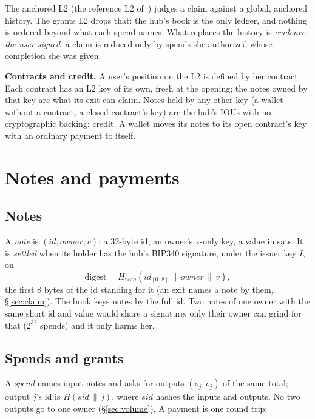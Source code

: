 \documentclass[11pt]{article}
\begin{document}
The anchored L2 (the reference L2 of~\cite{lichen}) judges a claim
against a global, anchored history. The grants L2 drops that: the hub's
book is the only ledger, and nothing is ordered beyond what each spend
names. What replaces the history is \emph{evidence the user signed}: a
claim is reduced only by spends she authorized whose completion she was
given.

\textbf{Contracts and credit.} A user's position on the L2 is defined by
her contract. Each contract has an L2 key of its own, fresh at the
opening; the notes owned by that key are what its exit can claim. Notes
held by any other key (a wallet without a contract, a closed contract's
key) are the hub's IOUs with no cryptographic backing: credit. A wallet
moves its notes to its open contract's key with an ordinary payment to
itself.

\section{Notes and payments}

\subsection{Notes}

A \emph{note} is $(\mathit{id}, \mathit{owner}, v)$: a 32-byte id, an
owner's x-only key, a value in sats. It is \emph{settled} when its holder
has the hub's BIP340 signature, under the issuer key $I$, on
\[
  \mathrm{digest} = H_{\text{note}}(\mathit{id}_{[0..8]} \,\|\,
  \mathit{owner} \,\|\, v),
\]
the first 8 bytes of the id standing for it (an exit names a note by
them, \S\ref{sec:claim}). The book keys notes by the full id. Two notes
of one owner with the same short id and value would share a signature;
only their owner can grind for that ($2^{32}$ spends) and it only harms
her.

\subsection{Spends and grants}\label{sec:grant}

A \emph{spend} names input notes and asks for outputs $(o_j, v_j)$ of the
same total; output $j$'s id is $H(\mathit{sid} \,\|\, j)$, where
$\mathit{sid}$ hashes the inputs and outputs. No two outputs go to one
owner (\S\ref{sec:volume}). A payment is one round trip:
\end{document}
